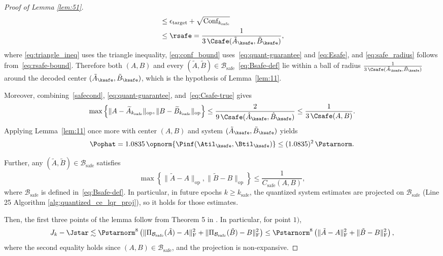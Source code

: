 \documentclass[11pt,journal,onecolumn]{IEEEtran}
\newcommand{\safe}{\mathrm{safe}}
\begin{document}
\begin{proof}[Proof of Lemma \ref{lem:51}]
\begin{subequations}
\begin{align}
             & \leq \epsilon_{\mathrm{target}} + \sqrt{\text{Conf}_{k_\safe}} \label{eq:conf_bound}                                                                                                             \\
             & \leq \rsafe = \frac{1}{3\,\Csafe(\tilde A_{\ksafe}, \tilde B_{\ksafe})}, \label{eq:safe_radius}
        \end{align}
    \end{subequations}
    where \eqref{eq:triangle_ineq} uses the triangle inequality, \eqref{eq:conf_bound} uses~\eqref{eq:quant-guarantee} and \eqref{eq:Esafe}, and \eqref{eq:safe_radius} follows from~\eqref{eq:rsafe-bound}. Therefore both $(A,B)$ and every $(\tilde A, \tilde B) \in \mathcal{B}_\safe$~\eqref{eq:Bsafe-def} lie within a ball of radius $\frac{1}{3\,\Csafe(\tilde A_{\ksafe}, \tilde B_{\ksafe})}$ around the decoded center $(\tilde A_{\ksafe}, \tilde B_{\ksafe})$, which is the hypothesis of Lemma~\ref{lem:11}.

    Moreover, combining~\eqref{safecond}, \eqref{eq:quant-guarantee}, and~\eqref{eq:Csafe-true} gives
    \begin{equation}\label{eq:decoded-near-true}
        \max \left\{ \| A - \widetilde{A}_{k_{\text{safe}}} \|_{\mathrm{op}} , \| B - \widetilde{B}_{k_{\text{safe}}} \|_{\mathrm{op}} \right\}
        \le \frac{2}{9\,\Csafe(\hat A_{\ksafe},\hat B_{\ksafe})}
        \le \frac{1}{3\,\Csafe(A,B)}.
    \end{equation}
    Applying Lemma~\ref{lem:11} once more with center $(A,B)$ and system $(\tilde A_{\ksafe}, \tilde B_{\ksafe})$ yields
    \begin{equation}\label{eq:Pophat-ratio}
        \Pophat = 1.0835\,\opnorm{\Pinf(\Atil_{\ksafe},\Btil_{\ksafe})} \le (1.0835)^2\,\Pstarnorm.
    \end{equation}

    Further,  any $(\tilde A, \tilde B) \in \mathcal{B}_\safe$ satisfies
    \begin{equation}
        \max \left \{ \| \tilde{A} - A \|_{\mathrm{op}}, \| \tilde{B} - B \|_{\mathrm{op}} \right\} \leq \frac{1}{C_\safe(A, B)},
    \end{equation}
    where $\mathcal{B}_{\mathrm{safe}}$ is defined in~\eqref{eq:Bsafe-def}. In particular, in future epochs $k \geq k_\safe$, the quantized system estimates are projected on $\mathcal{B}_\safe$ (Line 25 Algorithm \ref{alg:quantized_ce_lqr_proj}), so it holds for those estimates.

    Then, the first three points of the lemma follow from Theorem 5 in \cite{simchowitz20a}. In particular, for point $1)$,
    \begin{equation}
        J_k - \Jstar \lesssim  \Pstarnorm^8 \left(\|\Pi_{\mathcal{B}_\safe} (\tilde{A}) - A\|_{\text{F}}^2 + \|\Pi_{\mathcal{B}_\safe}(\tilde{B}) - B\|_{\text{F}}^2\right) \leq \Pstarnorm^8 \left(\|\tilde{A} - A\|_{\text{F}}^2 + \|\tilde{B} - B\|_{\text{F}}^2\right),
    \end{equation}
    where the second equality holds since $(A, B) \in \mathcal{B}_\safe$, and the projection is non-expansive.


\end{proof}
\end{document}
